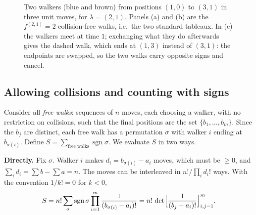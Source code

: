 \documentclass[11pt]{article}
\begin{document}
\begin{figure}[H]
\caption{Two walkers (blue and brown) from positions $(1,0)$ to $(3,1)$ in three unit moves, for $\lambda=(2,1)$. Panels (a) and (b) are the $f^{(2,1)}=2$ collision-free walks, i.e.\ the two standard tableaux. In (c) the walkers meet at time $1$; exchanging what they do afterwards gives the dashed walk, which ends at $(1,3)$ instead of $(3,1)$: the endpoints are swapped, so the two walks carry opposite signs and cancel.}\label{fig:hl_walkers}
\end{figure}

\subsection{Allowing collisions and counting with signs}
Consider all \emph{free walks}: sequences of $n$ moves, each choosing a walker, with no restriction on collisions, such that the final positions are the set $\{b_1,\dots,b_m\}$.
Since the $b_j$ are distinct, each free walk has a permutation $\sigma$ with walker $i$ ending at $b_{\sigma(i)}$. Define $S=\sum_{\text{free walks}}\operatorname{sgn}\sigma$. We evaluate $S$ in two ways.

\textbf{Directly.} Fix $\sigma$. Walker $i$ makes $d_i=b_{\sigma(i)}-a_i$ moves, which must be $\ge0$, and $\sum_i d_i=\sum b-\sum a=n$. The moves can be interleaved in $n!/\prod_i d_i!$ ways. With the convention $1/k!=0$ for $k<0$,
\begin{equation}\label{eq:det}
  S=n!\sum_{\sigma}\operatorname{sgn}\sigma\prod_{i=1}^m\frac1{(b_{\sigma(i)}-a_i)!}=n!\,\det\Bigl[\frac1{(b_j-a_i)!}\Bigr]_{i,j=1}^m .
\end{equation}
\end{document}
